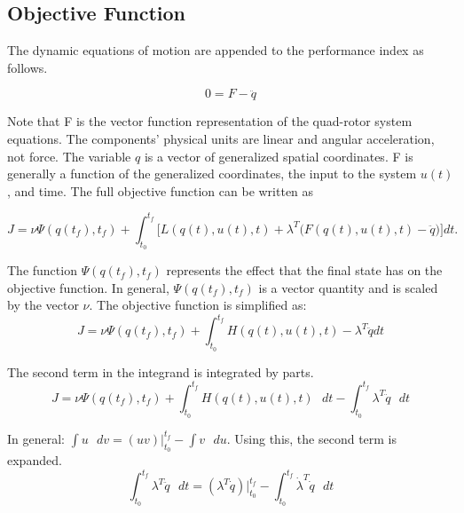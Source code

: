 \subsection{Objective Function}

The dynamic equations of motion are appended to the performance index as follows.

\begin{equation}
    0 = F - \ddot{q}
\end{equation}

Note that F is the vector function representation of the quad-rotor system equations. The components' physical units are linear and angular acceleration, not force. The variable $q$ is a vector of generalized spatial coordinates. F is generally a function of the generalized coordinates, the input to the system $u(t)$, and time. The full objective function can be written as


\begin{equation}
    J = \nu \Psi ( q(t_f),t_f ) + \int_{t_0}^{t_f}  \big[ L(q(t),u(t),t) + \lambda^T \big( F(q(t),u(t),t) - \ddot q \big)  \big] dt .
\end{equation}

The function $\Psi ( q(t_f),t_f )$ represents the effect that the final state has on the objective function. In general, $\Psi( q(t_f),t_f )$ is a vector quantity and is scaled by the vector $\nu$.
The objective function is simplified as:\\

\begin{equation}
    J = \nu \Psi ( q(t_f),t_f ) + \int_{t_0}^{t_f}  H(q(t),u(t),t) - \lambda^T \ddot q  dt
\end{equation}

The second term in the integrand is integrated by parts.\\

\begin{equation}
    J = \nu \Psi ( q(t_f),t_f ) + \int_{t_0}^{t_f}  H(q(t),u(t),t) \text{  } dt - \int_{t_0}^{t_f} \lambda^T \ddot q \text{  } dt
\end{equation}

In general:  $\int u \text{  }dv =  (uv)|_{t_0}^{t_f} - \int v \text{  }du $. Using this, the second term is expanded.\\

\begin{equation}
    \int_{t_0}^{t_f} \lambda^T \ddot q \text{  } dt  =  (\lambda^T \dot q) |_{t_0}^{t_f} - \int_{t_0}^{t_f} \dot \lambda^T  \dot q\text{  } dt
\end{equation}

